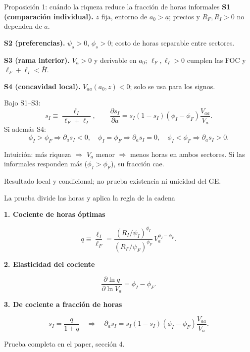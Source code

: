 \documentclass[aspectratio=169,11pt]{beamer}
\newcommand{\source}[1]{\par\vfill{\fontsize{8}{9.5}\selectfont\color{Gray}#1\par}}
\newcommand{\takeaway}[1]{\par\vspace{2mm}\begingroup\setlength{\fboxsep}{2.2mm}\colorbox{Pale}{\begin{minipage}{\dimexpr\linewidth-4.4mm\relax}\small\raggedright #1\end{minipage}}\endgroup\par}
\newcommand{\labeltext}[1]{\par{\small\bfseries\color{Teal}#1\par}\vspace{1.5mm}}
\begin{document}
\begin{frame}[label=resultado]{Proposición 1: cuándo la riqueza reduce la fracción de horas informales}
\footnotesize
\textbf{S1 (comparación individual).} $z$ fija, entorno de $a_0>\underline a$; precios y $R_F,R_I>0$ no dependen de $a$.\par
\textbf{S2 (preferencias).} $\psi_s>0$, $\phi_s>0$; costo de horas separable entre sectores.\par
\textbf{S3 (rama interior).} $V_a>0$ y derivable en $a_0$; $\ell_F,\ell_I>0$ cumplen las FOC y $\ell_F+\ell_I<\bar H$.\par
\textbf{S4 (concavidad local).} $V_{aa}(a_0,z)<0$; solo se usa para los signos.\par
\small Bajo S1--S3:
\begin{equation}
s_I\equiv\frac{\ell_I}{\ell_F+\ell_I},\qquad
\boxed{\frac{\partial s_I}{\partial a}=s_I(1-s_I)(\phi_I-\phi_F)\frac{V_{aa}}{V_a}.}
\end{equation}
\vspace{2mm}
\normalsize Si además S4:
\begin{equation}
\phi_I>\phi_F\Rightarrow\partial_a s_I<0,\quad
\phi_I=\phi_F\Rightarrow\partial_a s_I=0,\quad
\phi_I<\phi_F\Rightarrow\partial_a s_I>0.
\end{equation}
\takeaway{Intuición: más riqueza $\Rightarrow$ $V_a$ menor $\Rightarrow$ menos horas en ambos sectores. Si las informales responden más ($\phi_I>\phi_F$), su fracción cae.}
\source{Resultado local y condicional; no prueba existencia ni unicidad del GE.}
\end{frame}

\begin{frame}[label=prueba]{La prueba divide las horas y aplica la regla de la cadena}
\labeltext{1. Cociente de horas óptimas}
\begin{equation}q\equiv\frac{\ell_I}{\ell_F}=\frac{(R_I/\psi_I)^{\phi_I}}{(R_F/\psi_F)^{\phi_F}}\,V_a^{\phi_I-\phi_F}.\end{equation}
\labeltext{2. Elasticidad del cociente}
\begin{equation}\frac{\partial\ln q}{\partial\ln V_a}=\phi_I-\phi_F.\end{equation}
\labeltext{3. De cociente a fracción de horas}
\begin{equation}s_I=\frac{q}{1+q}\quad\Rightarrow\quad
\partial_a s_I=s_I(1-s_I)(\phi_I-\phi_F)\frac{V_{aa}}{V_a}.\end{equation}

\source{Prueba completa en el paper, sección 4.}
\end{frame}
\end{document}

